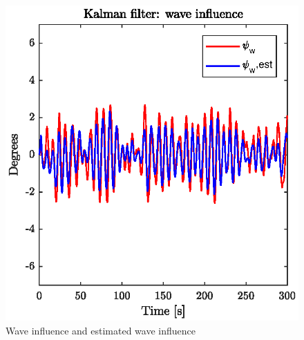 \begin{figure}[h]
	\centering
	\includegraphics[width=\textwidth]{figures/p5p5e_wave_influence.eps}
	\caption{Wave influence and estimated wave influence}
\label{fig:p5p5e_wave_influence}
\end{figure}